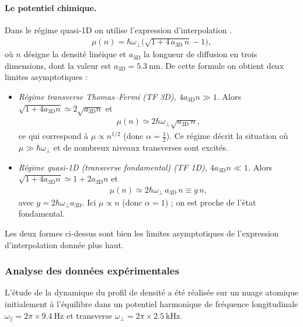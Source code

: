 

\paragraph{Le potentiel chimique.}
Dans le régime quasi-1D on utilise l'expression d'interpolation \cite{PhysRevA.68.043610}.
\begin{eqnarray}\label{chap4:eq.pot.s.1}
	\mu(n)=\hbar\omega_\perp\Big(\sqrt{1+4\,a_{\mathrm{3D}}\,n}-1\Big),
\end{eqnarray}
où \(n\) désigne la densité linéique et \(a_{\mathrm{3D}}\) la longueur de diffusion en trois dimensions, dont la valeur est \(a_{\mathrm{3D}} = 5.3~\mathrm{nm}\). De cette formule on obtient deux limites asymptotiques :

\begin{itemize}[label =$\bullet$]
	\item \emph{Régime transverse Thomas--Fermi (\gls{TF} 3D), \(4a_{\mathrm{3D}}n\gg1\).} 
		Alors \(\sqrt{1+4a_{\mathrm{3D}}n}\simeq 2\sqrt{a_{\mathrm{3D}}n}\) et
		\begin{eqnarray}
			\mu(n)\simeq 2\hbar\omega_\perp\sqrt{a_{\mathrm{3D}}\,n},
		\end{eqnarray}
		ce qui correspond à \(\mu\propto n^{1/2}\) (donc \(\alpha=\tfrac12\)). Ce régime décrit la situation où \(\mu\gg\hbar\omega_\perp\) et de nombreux niveaux transverses sont excités.
	\item \emph{Régime quasi-1D (transverse fondamental) (\gls{TF} 1D), \(4a_{\mathrm{3D}}n\ll1\).} 
		Alors \(\sqrt{1+4a_{\mathrm{3D}}n}\simeq 1+2a_{\mathrm{3D}}n\) et
		\begin{eqnarray}
			\mu(n)\simeq 2\hbar\omega_\perp\,a_{\mathrm{3D}}\,n \equiv g\,n,
		\end{eqnarray}
	avec \(g=2\hbar\omega_\perp a_{\mathrm{3D}}\). Ici \(\mu\propto n\) (donc \(\alpha=1\)) ; on est proche de l'état fondamental.
\end{itemize}

Les deux formes ci-dessus sont bien les limites asymptotiques de l'expression d'interpolation donnée plus haut.

\subsubsection{Analyse des données expérimentales}

L'étude de la dynamique du profil de densité a été réalisée sur un nuage atomique initialement à l'équilibre dans un potentiel harmonique de fréquence longitudinale $\omega_\parallel = 2 \pi \times 9.4~\mathrm{Hz}$ et transverse $\omega_\perp =2 \pi \times 2.5~\mathrm{kHz}$.  

